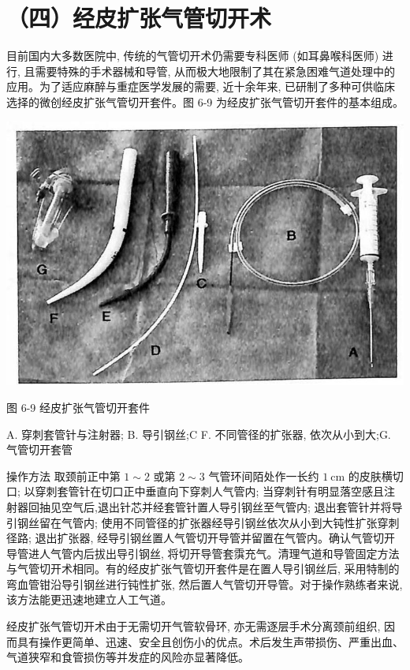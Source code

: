 \documentclass[10pt]{article}
\begin{document}
\section*{（四）经皮扩张气管切开术}
目前国内大多数医院中, 传统的气管切开术仍需要专科医师 (如耳鼻喉科医师) 进行, 且需要特殊的手术器械和导管, 从而极大地限制了其在紧急困难气道处理中的应用。为了适应麻醉与重症医学发展的需要, 近十余年来, 已研制了多种可供临床选择的微创经皮扩张气管切开套件。图 6-9 为经皮扩张气管切开套件的基本组成。

\begin{center}
\includegraphics[max width=\textwidth]{2024_07_09_002a177993bd97d1d6d7g-093}
\end{center}

图 6-9 经皮扩张气管切开套件

A. 穿刺套管针与注射器; B. 导引钢丝;C F. 不同管径的扩张器, 依次从小到大;G. 气管切开套管

操作方法 取颈前正中第 $1 \sim 2$ 或第 $2 \sim 3$ 气管环间陌处作一长约 $1 \mathrm{~cm}$ 的皮肤横切口; 以穿刺套管针在切口正中垂直向下穿刺人气管内; 当穿刺针有明显落空感且注射器回抽见空气后,退出针芯并经套管针置人导引钢丝至气管内; 退出套管针并将导引钢丝留在气管内; 使用不同管径的扩张器经导引钢丝依次从小到大钝性扩张穿刺径路; 退出扩张器, 经导引钢丝置人气管切开导管并留置在气管内。确认气管切开导管进人气管内后拔出导引钢丝, 将切开导管套霟充气。清理气道和导管固定方法与气管切开术相同。有的经皮扩张气管切开套件是在置人导引钢丝后, 采用特制的弯血管钳沿导引钢丝进行钝性扩张, 然后置人气管切开导管。对于操作熟练者来说,该方法能更迅速地建立人工气道。

经皮扩张气管切开术由于无需切开气管软骨环, 亦无需逐层手术分离颈前组织, 因而具有操作更简单、迅速、安全且创伤小的优点。术后发生声带损伤、严重出血、气道狭窄和食管损伤等并发症的风险亦显著降低。
\end{document}
